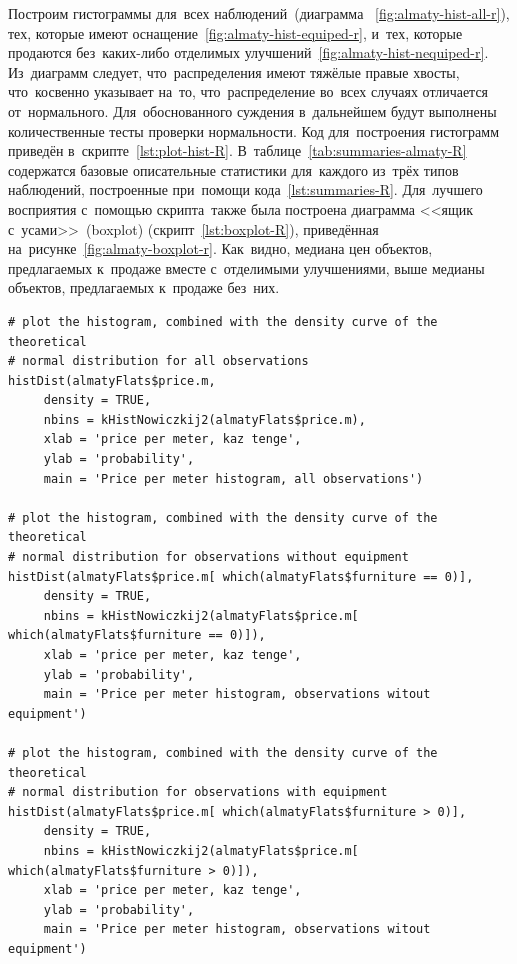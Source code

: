\documentclass[]{scrreprt}
\begin{document}
Построим гистограммы для~всех наблюдений~(диаграмма ~\ref{fig:almaty-hist-all-r}), тех, которые имеют оснащение~\ref{fig:almaty-hist-equiped-r}, и~тех, которые продаются без~каких-либо отделимых улучшений~\ref{fig:almaty-hist-nequiped-r}. Из~диаграмм следует, что~распределения имеют тяжёлые правые хвосты, что~косвенно указывает на~то, что~распределение во~всех случаях отличается от~нормального. Для~обоснованного суждения в~дальнейшем будут выполнены количественные тесты проверки нормальности. Код для~построения гистограмм приведён в~скрипте~\ref{lst:plot-hist-R}. В~таблице~\ref{tab:summaries-almaty-R} содержатся базовые описательные статистики для~каждого из~трёх типов наблюдений, построенные при~помощи кода~\ref{lst:summaries-R}. Для~лучшего восприятия с~помощью скрипта~также была построена диаграмма <<ящик с~усами>>~(\foreignlanguage{english}{boxplot}) (скрипт~\ref{lst:boxplot-R}), приведённая на~рисунке~\ref{fig:almaty-boxplot-r}. Как~видно, медиана цен объектов, предлагаемых к~продаже вместе с~отделимыми улучшениями, выше медианы объектов, предлагаемых к~продаже без~них. 
%
\begin{lstlisting}[float, caption = Построение гистограмм для~наблюдений различных типов, firstnumber=1, label= lst:plot-hist-R]
# plot the histogram, combined with the density curve of the theoretical
# normal distribution for all observations
histDist(almatyFlats$price.m,
     density = TRUE,
     nbins = kHistNowiczkij2(almatyFlats$price.m),
     xlab = 'price per meter, kaz tenge',
     ylab = 'probability',
     main = 'Price per meter histogram, all observations')
     
# plot the histogram, combined with the density curve of the theoretical
# normal distribution for observations without equipment
histDist(almatyFlats$price.m[ which(almatyFlats$furniture == 0)],
     density = TRUE,
     nbins = kHistNowiczkij2(almatyFlats$price.m[ which(almatyFlats$furniture == 0)]),
     xlab = 'price per meter, kaz tenge',
     ylab = 'probability',
     main = 'Price per meter histogram, observations witout equipment')
     
# plot the histogram, combined with the density curve of the theoretical
# normal distribution for observations with equipment
histDist(almatyFlats$price.m[ which(almatyFlats$furniture > 0)],
     density = TRUE,
     nbins = kHistNowiczkij2(almatyFlats$price.m[ which(almatyFlats$furniture > 0)]),
     xlab = 'price per meter, kaz tenge',
     ylab = 'probability',
     main = 'Price per meter histogram, observations witout equipment')
\end{lstlisting}
\end{document}
